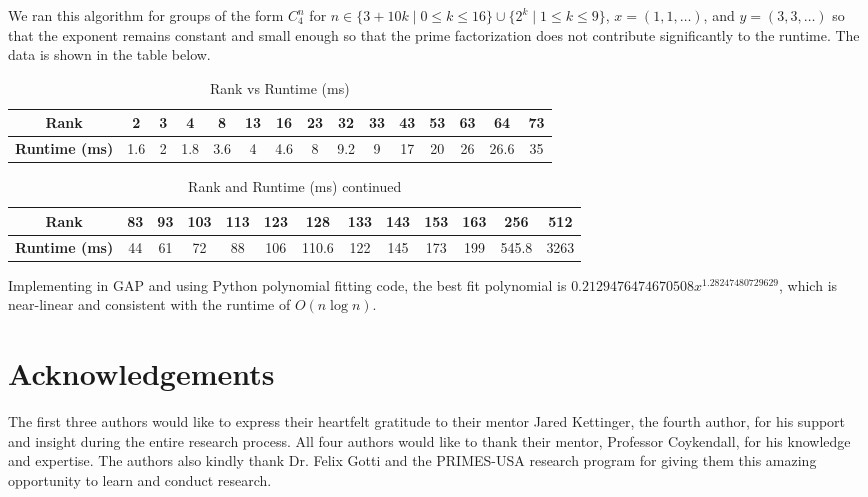 \documentclass[11pt]{amsart}
\theoremstyle{definition}
\renewcommand{\leq}{\leqslant}
\numberwithin{equation}{section}
\begin{document}
We ran this algorithm for groups of the form $C_4^n$ for $n \in \{3+10k \mid 0 \leq k \leq 16\} \cup \{2^k \mid 1 \leq k \leq 9\}$, $x 
= (1, 1, \dots)$, and $y = (3, 3, \dots)$ so that the exponent remains constant and small enough so that the prime factorization does not contribute significantly to the runtime. The data is shown in the table below. 
\begin{table}[h!]
    \centering
    \begin{tabular}{|c|*{14}{c|}}
        \hline
        \textbf{Rank} & 2 & 3 & 4 & 8 & 13 & 16 & 23 & 32 & 33 & 43 & 53 & 63 & 64 & 73 \\
        \hline
        \textbf{Runtime (ms)} & 1.6 & 2 & 1.8 & 3.6 & 4 & 4.6 & 8 & 9.2 & 9 & 17 & 20 & 26 & 26.6 & 35 \\
        \hline
    \end{tabular}
    \caption{Rank vs Runtime (ms)}
\end{table}

\begin{table}[h!]
    \centering
    \begin{tabular}{|c|*{12}{c|}}
        \hline
        \textbf{Rank} & 83 & 93 & 103 & 113 & 123 & 128 & 133 & 143 & 153 & 163 & 256 & 512 \\
        \hline
        \textbf{Runtime (ms)} & 44 & 61 & 72 & 88 & 106 & 110.6 & 122 & 145 & 173 & 199 & 545.8 & 3263 \\
        \hline
    \end{tabular}
    \caption{Rank and Runtime (ms) continued}
\end{table}
Implementing in GAP and using Python polynomial fitting code, the best fit polynomial is $0.2129476474670508x^{1.28247480729629}$, which is near-linear and consistent with the runtime of $O(n\log n)$. 
 

\section*{Acknowledgements}
The first three authors would like to express their heartfelt gratitude to their mentor Jared Kettinger, the fourth author, for his support and insight during the entire research process. All four authors would like to thank their mentor, Professor Coykendall, for his knowledge and expertise. The authors also kindly thank Dr. Felix Gotti and the PRIMES-USA research program for giving them this amazing opportunity to learn and conduct research. 

\end{document}
